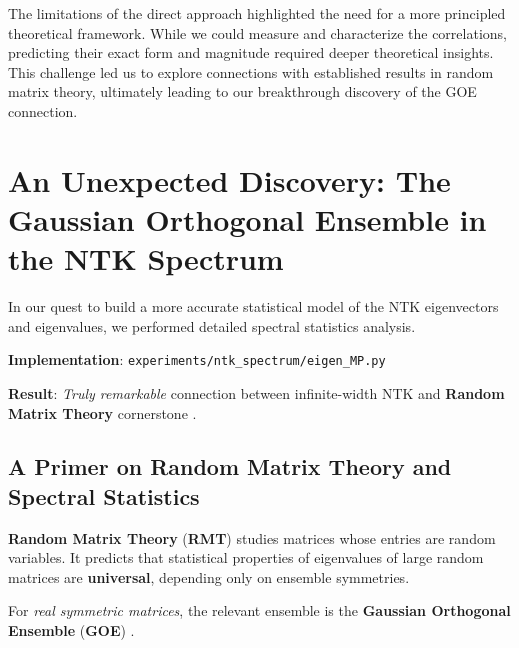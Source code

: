 \documentclass[a4paper]{article}
\theoremstyle{plain}
\theoremstyle{definition}
\theoremstyle{remark}
\begin{document}
The limitations of the direct approach highlighted the need for a more principled theoretical framework. While we could measure and characterize the correlations, predicting their exact form and magnitude required deeper theoretical insights. This challenge led us to explore connections with established results in random matrix theory, ultimately leading to our breakthrough discovery of the GOE connection.























\newpage
\section{An Unexpected Discovery: The Gaussian Orthogonal Ensemble in the NTK Spectrum}

\begin{tcolorbox}[colback=red!15,colframe=red!70!black,title={\textbf{🚀 BREAKTHROUGH DISCOVERY: NTK-GOE Connection}},enhanced,drop shadow]
In our quest to build a more accurate statistical model of the \textcolor{kernelcolor}{NTK} eigenvectors and eigenvalues, we performed detailed spectral statistics analysis.

\textbf{Implementation}: \texttt{experiments/ntk\_spectrum/eigen\_MP.py}

\textbf{Result}: \textit{Truly remarkable} connection between infinite-width \textcolor{kernelcolor}{NTK} and \textcolor{purple!80!black}{\textbf{Random Matrix Theory}} cornerstone \cite{guillen_misof_gerken_2025,dyer_gur_ari_2019}.
\end{tcolorbox}

\subsection{A Primer on Random Matrix Theory and Spectral Statistics}

\begin{tcolorbox}[colback=yellow!10,colframe=yellow!60!black,title={\textbf{📖 DEFINITION: Random Matrix Theory Fundamentals}},enhanced,drop shadow]
\textcolor{purple!80!black}{\textbf{Random Matrix Theory}} (\textcolor{purple!80!black}{\textbf{RMT}}) studies matrices whose entries are random variables. It predicts that statistical properties of eigenvalues of large random matrices are \textbf{universal}, depending only on ensemble symmetries.

For \textit{real symmetric matrices}, the relevant ensemble is the \textcolor{purple!80!black}{\textbf{Gaussian Orthogonal Ensemble}} (\textcolor{purple!80!black}{\textbf{GOE}}) \cite{dyer_gur_ari_2019}.
\end{tcolorbox}
\end{document}
